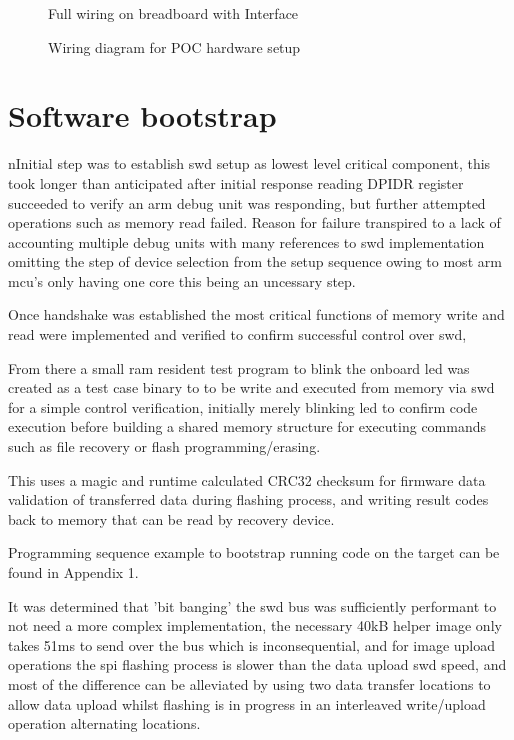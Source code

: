 \begin{figure}[ht]
	\centering
	\caption{Full wiring on breadboard with Interface}
	\label{fig:FullPOCwiring}
\end{figure}

\begin{figure}[ht]
	\centering
	\caption{Wiring diagram for POC hardware setup}
	\label{fig:FullPOCwiringDiagram}
\end{figure}
\clearpage
\section{Software bootstrap}
nInitial step was to establish \gls{swd} setup as lowest level critical component, this took longer than anticipated after initial response reading DPIDR register succeeded to verify an \gls{arm} debug unit was responding, but further attempted operations such as memory read failed. Reason for failure transpired to a lack of accounting multiple debug units\cite{raspberrypiltdRaspberryPiPico} with many references to \gls{swd} implementation omitting the step of device selection from the setup sequence owing to most \gls{arm} \gls{mcu}'s only having one core this being an uncessary step.

Once handshake was established the most critical functions of memory write and read were implemented and verified to confirm successful control over \gls{swd}, 

From there a small \gls{ram} resident test program to blink the onboard \gls{led} was created as a test case binary to to be write and executed from memory via \gls{swd} for a simple control verification, initially merely blinking \gls{led} to confirm code execution before building a shared memory structure for executing commands such as file recovery or flash programming/erasing.

This uses a \gls{magic} and runtime calculated CRC32 checksum for firmware data validation of transferred data during flashing process, and writing result codes back to memory that can be read by recovery device.

Programming sequence example to bootstrap running code on the target can be found in Appendix 1.

It was determined that 'bit banging' the \gls{swd} bus was sufficiently performant to not need a more complex implementation, the necessary 40kB helper image only takes 51ms to send over the bus which is inconsequential, and for  image upload operations the \gls{spi} flashing process is slower than the data upload  \gls{swd} speed, and most of the difference can be alleviated by using two data transfer locations to allow data upload whilst flashing is in progress in an interleaved write/upload operation alternating locations.

